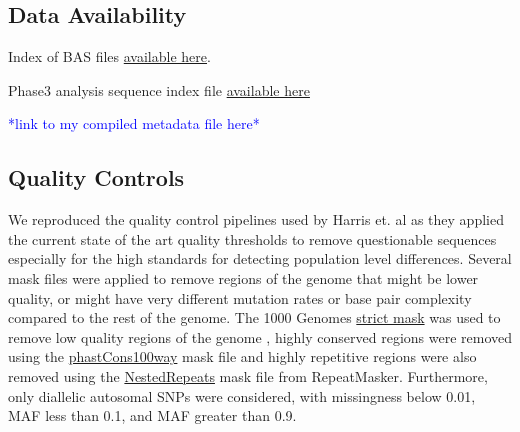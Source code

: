 \documentclass[9pt,lineno]{elife}
\newcommand{\todo}[1]{\textcolor{blue}{*#1*}}
\begin{document}
\subsection{Data Availability}

Index of BAS files \href{http://ftp.1000genomes.ebi.ac.uk/vol1/ftp/data_collections/1000_genomes_project/1000genomes.low_coverage.GRCh38DH.alignment.index}{available here}.

Phase3 analysis sequence index file  \href{http://ftp.1000genomes.ebi.ac.uk/vol1/ftp/phase3/20130502.phase3.analysis.sequence.index}{available here} 

\todo{link to my compiled metadata file here}

\subsection{Quality Controls}
We reproduced the quality control pipelines used by Harris et. al as they applied the current state of the art quality thresholds to remove questionable sequences especially for the high standards for detecting population level differences. 
Several mask files were applied to remove regions of the genome that might be lower quality, or might have very different mutation rates or base pair complexity compared to the rest of the genome. 
The  1000 Genomes \href{http://ftp.1000genomes.ebi.ac.uk/vol1/ftp/release/20130502/supporting/accessible_genome_masks/20141020.strict_mask.whole_genome.bed}{strict mask} was used to remove low quality regions of the genome , highly conserved regions were removed using the \href{http://hgdownload.cse.ucsc.edu/goldenPath/hg19/database/phastConsElements100way.txt.gz}{phastCons100way} mask file and highly repetitive regions were also removed using the \href{http://hgdownload.cse.ucsc.edu/goldenpath/hg19/database/nestedRepeats.txt.gz}{NestedRepeats} mask file from RepeatMasker. 
Furthermore, only diallelic autosomal SNPs were considered, with missingness below 0.01, MAF less than 0.1, and MAF greater than 0.9.
\end{document}
